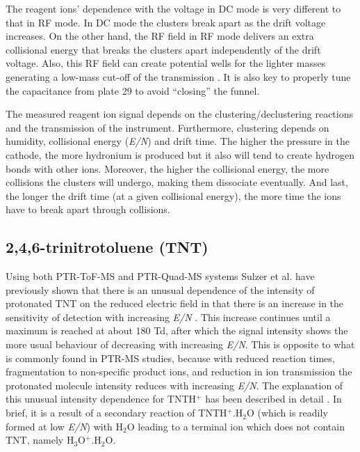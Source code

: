 The reagent ions' dependence with the voltage in DC mode is very different to that in RF mode. In DC mode the clusters break apart as the drift voltage increases. On the other hand, the RF field in RF mode delivers an extra collisional energy that breaks the clusters apart independently of the drift voltage. Also, this RF field can create potential wells for the lighter masses generating a low-mass cut-off of the transmission \cite{Chung123}. It is also key to properly tune the capacitance from plate 29 to avoid ``closing'' the funnel.

The measured reagent ion signal depends on the clustering/declustering reactions and the transmission of the instrument. Furthermore, clustering depends on humidity, collisional energy (\textit{E/N}) and drift time. The higher the pressure in the cathode, the more hydronium is produced but it also will tend to create hydrogen bonds with other ions. Moreover, the higher the collisional energy, the more collisions the clusters will undergo, making them dissociate eventually. And last, the longer the drift time (at a given collisional energy), the more time the ions have to break apart through collisions.









\subsection{2,4,6-trinitrotoluene (TNT)}
Using both PTR-ToF-MS and PTR-Quad-MS systems Sulzer et al. have previously shown that there is an unusual dependence of the intensity of protonated TNT on the reduced electric field in that there is an increase in the sensitivity of detection with increasing \textit{E/N} \cite{sulzer2012proton,mayhew2010applications}. This increase continues until a maximum is reached at about 180 Td, after which the signal intensity shows the more usual behaviour of decreasing with increasing \textit{E/N}. This is opposite to what is commonly found in PTR-MS studies, because with reduced reaction times, fragmentation to non-specific product ions, and reduction in ion transmission the protonated molecule intensity reduces with increasing \textit{E/N}. The explanation of this unusual intensity dependence for TNTH$^+$ has been described in detail \cite{sulzer2012proton}. In brief, it is a result of a secondary reaction of TNTH$^+$.H$_2$O (which is readily formed at low \textit{E/N}) with H$_2$O leading to a terminal ion which does not contain TNT, namely H$_3$O$^+$.H$_2$O. 

